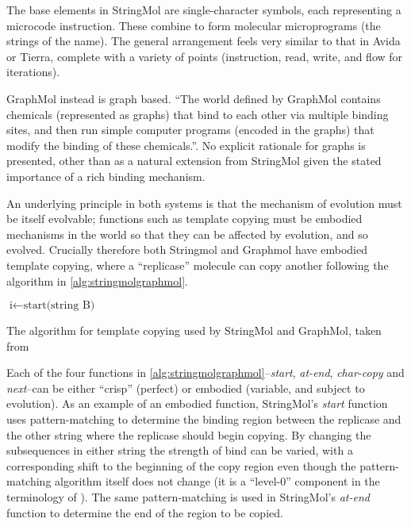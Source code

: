 The base elements in StringMol are single-character symbols, each representing a microcode instruction. These combine to form molecular microprograms (the strings of the name). The general arrangement feels very similar to that in Avida or Tierra, complete with a variety of points (instruction, read, write, and flow for iterations).

GraphMol instead is graph based. ``The world defined by GraphMol contains chemicals (represented as graphs) that bind to each other via multiple binding sites, and then run simple computer programs (encoded in the graphs) that modify the binding of these chemicals.''. No explicit rationale for graphs is presented, other than as a natural extension from StringMol given the stated importance of a rich binding mechanism. 

An underlying principle in both systems is that the mechanism of evolution must be itself evolvable; functions such as template copying must be embodied mechanisms in the world so that they can be affected by evolution, and so evolved.  Crucially therefore both Stringmol and Graphmol have embodied template copying, where a ``replicase'' molecule can copy another following the algorithm in \ref{alg:stringmolgraphmol}.

\begin{algorithm}[ht]
$\text{i} \leftarrow \text{start(string B)}$\;
\label{alg:stringmolgraphmol}
\caption{The algorithm for template copying used by StringMol and GraphMol, taken from \cite{Nellis2014}}
\end{algorithm}

Each of the four functions in \ref{alg:stringmolgraphmol}--\emph{start}, \emph{at-end}, \emph{char-copy} and \emph{next}--can be either ``crisp'' (\ie perfect) or embodied (variable, and subject to evolution). As an example of an embodied function, StringMol's \emph{start} function uses pattern-matching to determine the binding region between the replicase and the other string where the replicase should begin copying. By changing the subsequences in either string the strength of bind can be varied, with a corresponding shift to the beginning of the copy region even though the pattern-matching algorithm itself does not change (it is a ``level-0'' component in the terminology of \cite{BanzhafBaumgaertnerBeslonEtAl2016}). The same pattern-matching is used in StringMol's \emph{at-end} function to determine the end of the region to be copied.


